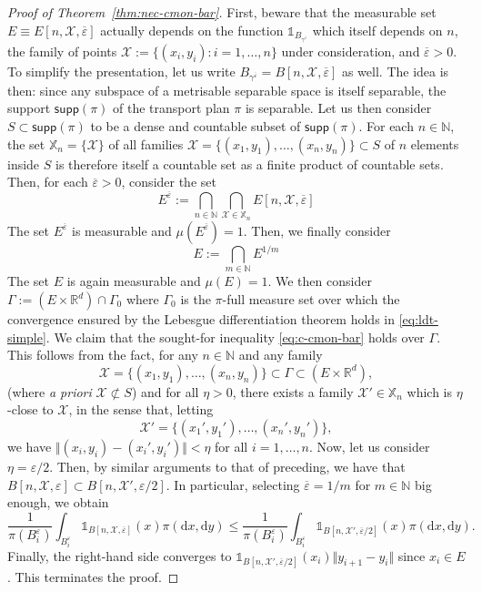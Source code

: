 \documentclass[leqno, 11pt, a4paper]{amsart}
\theoremstyle{definition}
\newcommand{\R}{\mathbb{R}}
\newcommand{\N}{\mathbb{N}}
\newcommand{\eps}{\varepsilon}
\newcommand{\supp}{\textsf{supp}}
\newcommand{\dd}{\mathrm{d}}
\begin{document}
\begin{proof}[Proof of Theorem~\ref{thm:nec-cmon-bar}]
     First, beware that the measurable set $E \equiv E[n, \mathcal{X}, \overline{\eps}]$ actually depends on the function $\mathds{1}_{B_{\gamma^{\overline{\eps}}}}$ which itself depends on $n$, the family of points $\mathcal{X} := \{(x_i, y_i) : i = 1, \dots, n\}$ under consideration, and $\overline{\eps} > 0$. To simplify the presentation, let us write $B_{\gamma^{\overline{\eps}}} = B[n, \mathcal{X}, \overline{\eps}]$ as well. The idea is then: since any subspace of a metrisable separable space is itself separable, the support $\supp(\pi)$ of the transport plan $\pi$  is separable. Let us then consider $S \subset \supp(\pi)$ to be a dense and countable subset of $\supp(\pi)$. For each $n \in \N$, the set $\mathbb{X}_n = \{\mathcal{X}\}$ of all families $\mathcal{X} = \{(x_1, y_1), \dots, (x_n, y_n) \} \subset S$ of $n$ elements inside $S$ is therefore itself a countable set as a finite product of countable sets. Then, for each $\overline{\eps} > 0$, consider the set 
$$
E^{\overline{\eps}} := \bigcap_{n \in \N} \bigcap_{\mathcal{X} \in \mathbb{X}_n} E[n, \mathcal{X}, \overline{\eps}]
$$
The set $E^{\overline{\eps}}$ is measurable and $\mu(E^{\overline{\eps}}) = 1$. Then, we finally consider 
$$
E := \bigcap_{m \in \N} E^{1/m}
$$ 
The set $E$ is again measurable and $\mu(E) = 1$. We then consider $\Gamma := (E \times \R^d)\cap \Gamma_0$ where $\Gamma_0$ is the $\pi$-full measure set over which the convergence ensured by the Lebesgue differentiation theorem holds in \eqref{eq:ldt-simple}. We claim that the sought-for inequality \eqref{eq:c-cmon-bar} holds over $\Gamma$. This follows from the fact, for any $n \in \N$ and any family 
$$
\mathcal{X} = \{(x_1, y_1), \dots, (x_n, y_n) \} \subset \Gamma \subset (E \times \R^d),$$
(where \textit{a priori} $\mathcal{X} \not\subset S$) and for all $\eta > 0$, there exists a family $\mathcal{X}' \in \mathbb{X}_n$ which is $\eta$-close to $\mathcal{X}$, in the sense that, letting
$$
\mathcal{X}' = \{(x_1', y_1'), \dots, (x_n', y_n') \},
$$ 
we have $\Vert (x_i, y_i) - (x_i', y_i')\Vert < \eta$ for all $i = 1, \dots, n$. Now, let us consider $\eta = \eps/2$. Then, by similar arguments to that of preceding, we have that $B[n, \mathcal{X}, \eps] \subset B[n, \mathcal{X}', \eps/2]$. In particular, selecting $\overline{\eps} = 1/m$ for $m \in \N$ big enough, we obtain
 \begin{equation}
\frac1{\pi(B_i^\eps)} \int_{B_i^\eps} \mathds{1}_{B[n, \mathcal{X}, \overline{\eps}]}(x) \pi(\dd x, \dd y) \leq \frac1{\pi(B_i^\eps)} \int_{B_i^\eps} \mathds{1}_{B[n, \mathcal{X}', \overline{\eps}/2]}(x) \pi(\dd x, \dd y).
\end{equation}
Finally, the right-hand side converges to $\mathds{1}_{B[n, \mathcal{X}', \overline{\eps}/2]}(x_i) \Vert y_{i+1} - y_i\Vert$ since $x_i \in E$. This terminates the proof.

     
   
	\end{proof}
\end{document}
